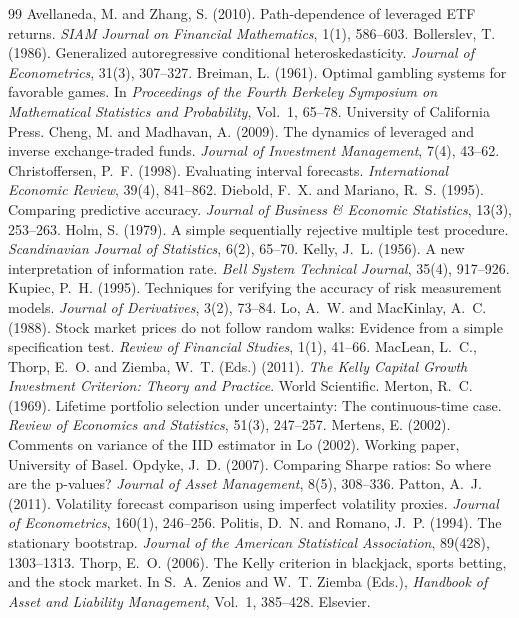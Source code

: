 \documentclass[11pt,a4paper]{article}
\begin{document}
\begin{thebibliography}{99}
\footnotesize
\setlength{\itemsep}{0.2em}
Avellaneda, M. and Zhang, S. (2010). Path-dependence of leveraged ETF returns. \emph{SIAM Journal on Financial Mathematics}, 1(1), 586--603.
Bollerslev, T. (1986). Generalized autoregressive conditional heteroskedasticity. \emph{Journal of Econometrics}, 31(3), 307--327.
Breiman, L. (1961). Optimal gambling systems for favorable games. In \emph{Proceedings of the Fourth Berkeley Symposium on Mathematical Statistics and Probability}, Vol.~1, 65--78. University of California Press.
Cheng, M. and Madhavan, A. (2009). The dynamics of leveraged and inverse exchange-traded funds. \emph{Journal of Investment Management}, 7(4), 43--62.
Christoffersen, P.~F. (1998). Evaluating interval forecasts. \emph{International Economic Review}, 39(4), 841--862.
Diebold, F.~X. and Mariano, R.~S. (1995). Comparing predictive accuracy. \emph{Journal of Business \& Economic Statistics}, 13(3), 253--263.
Holm, S. (1979). A simple sequentially rejective multiple test procedure. \emph{Scandinavian Journal of Statistics}, 6(2), 65--70.
Kelly, J.~L. (1956). A new interpretation of information rate. \emph{Bell System Technical Journal}, 35(4), 917--926.
Kupiec, P.~H. (1995). Techniques for verifying the accuracy of risk measurement models. \emph{Journal of Derivatives}, 3(2), 73--84.
Lo, A.~W. and MacKinlay, A.~C. (1988). Stock market prices do not follow random walks: Evidence from a simple specification test. \emph{Review of Financial Studies}, 1(1), 41--66.
MacLean, L.~C., Thorp, E.~O. and Ziemba, W.~T. (Eds.) (2011). \emph{The Kelly Capital Growth Investment Criterion: Theory and Practice}. World Scientific.
Merton, R.~C. (1969). Lifetime portfolio selection under uncertainty: The continuous-time case. \emph{Review of Economics and Statistics}, 51(3), 247--257.
Mertens, E. (2002). Comments on variance of the IID estimator in Lo (2002). Working paper, University of Basel.
Opdyke, J.~D. (2007). Comparing Sharpe ratios: So where are the p-values? \emph{Journal of Asset Management}, 8(5), 308--336.
Patton, A.~J. (2011). Volatility forecast comparison using imperfect volatility proxies. \emph{Journal of Econometrics}, 160(1), 246--256.
Politis, D.~N. and Romano, J.~P. (1994). The stationary bootstrap. \emph{Journal of the American Statistical Association}, 89(428), 1303--1313.
Thorp, E.~O. (2006). The Kelly criterion in blackjack, sports betting, and the stock market. In S.~A. Zenios and W.~T. Ziemba (Eds.), \emph{Handbook of Asset and Liability Management}, Vol.~1, 385--428. Elsevier.
\end{thebibliography}
\end{document}
